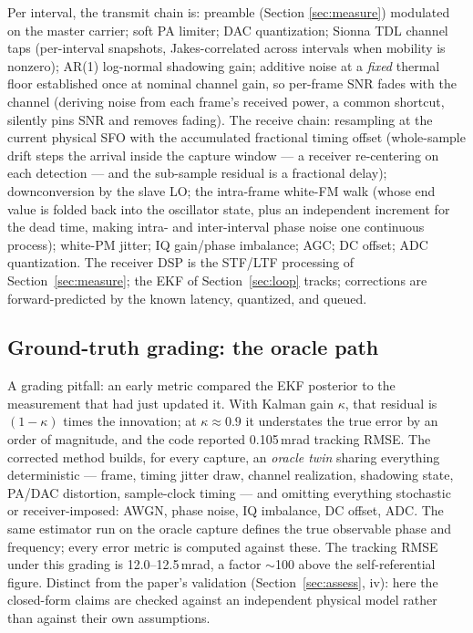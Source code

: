 \documentclass[10pt]{article}
\begin{document}
Per interval, the transmit chain is: preamble (Section
\ref{sec:measure}) modulated on the master carrier; soft PA limiter; DAC
quantization; Sionna TDL channel taps (per-interval snapshots,
Jakes-correlated across intervals when mobility is nonzero); AR(1)
log-normal shadowing gain; additive noise at a \emph{fixed} thermal floor
established once at nominal channel gain, so per-frame SNR fades with
the channel (deriving noise from each frame's received power, a common
shortcut, silently pins SNR and removes fading). The receive chain:
resampling at the current physical SFO with the accumulated fractional
timing offset (whole-sample drift steps the arrival inside the capture
window --- a receiver re-centering on each detection --- and the
sub-sample residual is a fractional delay); downconversion by the slave
LO; the intra-frame white-FM walk (whose end value is folded back into
the oscillator state, plus an independent increment for the dead time,
making intra- and inter-interval phase noise one continuous process);
white-PM jitter; IQ gain/phase imbalance; AGC; DC offset; ADC
quantization. The receiver DSP is the STF/LTF processing of
Section~\ref{sec:measure}; the EKF of Section~\ref{sec:loop} tracks;
corrections are forward-predicted by the known latency, quantized, and
queued.

\subsection{Ground-truth grading: the oracle path}
\label{sec:oracle}
A grading pitfall: an early metric compared the EKF posterior to the
measurement that had just updated it. With Kalman gain $\kappa$, that
residual is $(1-\kappa)$ times the innovation; at $\kappa\approx0.9$ it
understates the true error by an order of magnitude, and the code
reported 0.105\,mrad tracking RMSE. The corrected method builds, for
every capture, an \emph{oracle twin} sharing everything deterministic ---
frame, timing jitter draw, channel realization, shadowing state, PA/DAC
distortion, sample-clock timing --- and omitting everything stochastic or
receiver-imposed: AWGN, phase noise, IQ imbalance, DC offset, ADC. The
same estimator run on the oracle capture defines the true observable
phase and frequency; every error metric is computed against these. The
tracking RMSE under this grading is 12.0--12.5\,mrad, a factor
$\sim$100 above the self-referential figure. Distinct from the paper's
validation (Section~\ref{sec:assess}, iv): here the closed-form claims
are checked against an independent physical model rather than against
their own assumptions.
\end{document}
